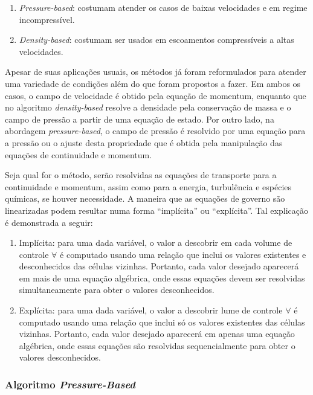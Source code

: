 \begin{enumerate}
    \item \textit{Pressure-based}: costumam atender os casos de baixas velocidades e em regime incompressível.
    \item \textit{Density-based}: costumam ser usados em escoamentos compressíveis a altas velocidades.
\end{enumerate}

Apesar de suas aplicações usuais, os métodos já foram reformulados para atender uma variedade de condições além do que foram propostos a fazer. Em ambos os casos, o campo de velocidade é obtido pela equação de momentum, enquanto que no algoritmo \textit{density-based} resolve a densidade pela conservação de massa e o campo de pressão a partir de uma equação de estado. Por outro lado, na abordagem \textit{pressure-based}, o campo de pressão é resolvido por uma equação para a pressão ou o ajuste desta propriedade que é obtida pela manipulação das equações de continuidade e momentum.

Seja qual for o método, serão resolvidas as equações de transporte para a continuidade e momentum, assim como para a energia, turbulência e espécies químicas, se houver necessidade. A maneira que as equações de governo são linearizadas podem resultar numa forma “implícita” ou “explícita”. Tal explicação é demonstrada a seguir:

\begin{enumerate}
    \item Implícita: para uma dada variável, o valor a descobrir em cada volume de controle \(\forall\) é computado usando uma relação que inclui os valores existentes e desconhecidos das células vizinhas. Portanto, cada valor desejado aparecerá em mais de uma equação algébrica, onde essas equações devem ser resolvidas simultaneamente para obter o valores desconhecidos.
    \item Explícita: para uma dada variável, o valor a descobrir lume de controle \(\forall\) é computado usando uma relação que inclui só os valores existentes das células vizinhas. Portanto, cada valor desejado aparecerá em apenas uma equação algébrica, onde essas equações são resolvidas sequencialmente para obter o valores desconhecidos. 
\end{enumerate}

\subsubsection{Algoritmo \textit{Pressure-Based}}

